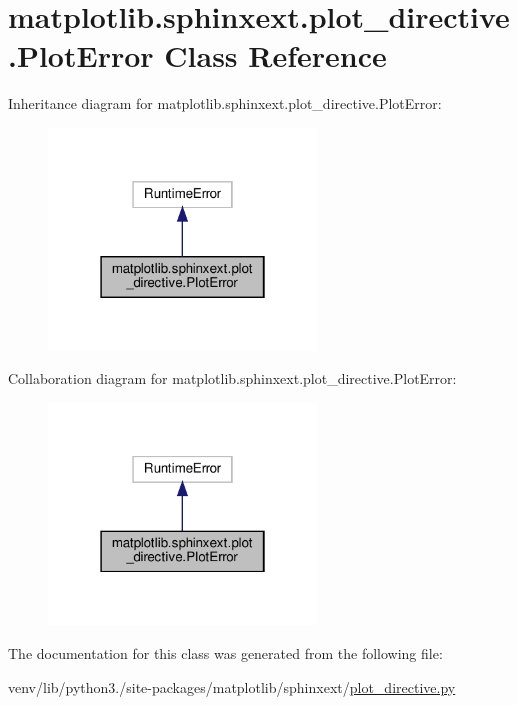 \hypertarget{classmatplotlib_1_1sphinxext_1_1plot__directive_1_1PlotError}{}\section{matplotlib.\+sphinxext.\+plot\+\_\+directive.\+Plot\+Error Class Reference}
\label{classmatplotlib_1_1sphinxext_1_1plot__directive_1_1PlotError}


Inheritance diagram for matplotlib.\+sphinxext.\+plot\+\_\+directive.\+Plot\+Error\+:
\nopagebreak
\begin{figure}[H]
\begin{center}
\leavevmode
\includegraphics[width=202pt]{classmatplotlib_1_1sphinxext_1_1plot__directive_1_1PlotError__inherit__graph}
\end{center}
\end{figure}


Collaboration diagram for matplotlib.\+sphinxext.\+plot\+\_\+directive.\+Plot\+Error\+:
\nopagebreak
\begin{figure}[H]
\begin{center}
\leavevmode
\includegraphics[width=202pt]{classmatplotlib_1_1sphinxext_1_1plot__directive_1_1PlotError__coll__graph}
\end{center}
\end{figure}


The documentation for this class was generated from the following file\+:\begin{DoxyCompactItemize}
\item 
venv/lib/python3./site-\/packages/matplotlib/sphinxext/\hyperlink{plot__directive_8py}{plot\+\_\+directive.\+py}\end{DoxyCompactItemize}
